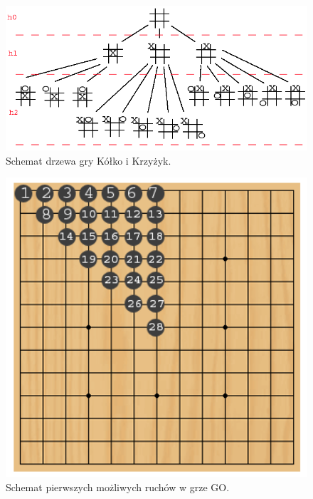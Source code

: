 \begin{par}
\begin{figure}[!h]
	\centering
	\includegraphics[width=5in]{obrazki/chess_tree.png}
	\caption{Schemat drzewa gry Kółko i Krzyżyk.}
	\label{fig:xo_tree}
\end{figure}

\begin{figure}[!h]
	\centering
	\includegraphics[width=5in]{obrazki/go_tree.png}
	\caption{Schemat pierwszych możliwych ruchów w grze GO.}
	\label{fig:go_tree}
\end{figure}

\end{par}
